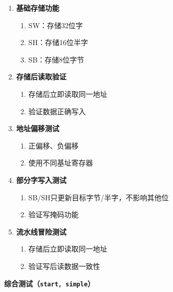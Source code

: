 \documentclass[12pt,a4paper]{ctexart}
\newcommand{\code}[1]{\texttt{#1}}
\begin{document}
\begin{enumerate}
    \item \textbf{基础存储功能}
    \begin{enumerate}
        \item SW：存储32位字
        \item SH：存储16位半字
        \item SB：存储8位字节
    \end{enumerate}
    
    \item \textbf{存储后读取验证}
    \begin{enumerate}
        \item 存储后立即读取同一地址
        \item 验证数据正确写入
    \end{enumerate}
    
    \item \textbf{地址偏移测试}
    \begin{enumerate}
        \item 正偏移、负偏移
        \item 使用不同基址寄存器
    \end{enumerate}
    
    \item \textbf{部分字写入测试}
    \begin{enumerate}
        \item SB/SH只更新目标字节/半字，不影响其他位
        \item 验证写掩码功能
    \end{enumerate}
    
    \item \textbf{流水线冒险测试}
    \begin{enumerate}
        \item 存储后立即读取同一地址
        \item 验证写后读数据一致性
    \end{enumerate}
\end{enumerate}

\textbf{综合测试（\code{start, simple}）}
\end{document}
